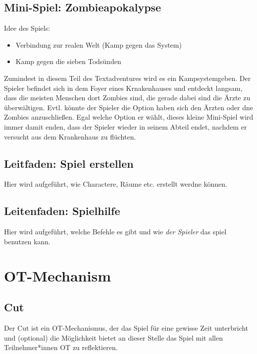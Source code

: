 \documentclass[a4paper, 12pt]{scrartcl}
\begin{document}
    \subsection{Mini-Spiel: Zombieapokalypse} \label{zombieapokalypse}
    Idee des Spiels:
    \begin{itemize}
    \item Verbindung zur realen Welt (Kamp gegen das System)
    \item Kamp gegen die sieben Todsünden
    \end{itemize}
    Zumindest in diesem Teil des Textadventures wird es ein Kampsystemgeben. 
    Der Spieler befindet sich in dem Foyer eines Krnakenhauses und entdeckt langsam, dass die meisten Menschen dort Zombies sind, die gerade dabei sind die Ärzte zu überwältigen. 
    Evtl. könnte der Spieler die Option haben sich den Ärzten oder dne Zombies anzuschließen.
    Egal welche Option er wählt, dieses kleine Mini-Spiel wird immer damit enden, dass der Spieler wieder in seinem Abteil endet, nachdem er versucht aus dem Krankenhaus zu flüchten.
    
    \subsection{Leitfaden: Spiel erstellen}
    Hier wird aufgeführt, wie Charactere, Räume etc. erstellt werdne können.
    
    \subsection{Leitenfaden: Spielhilfe}
    Hier wird aufgeführt, welche Befehle es gibt und wie \textit{der Spieler} das spiel benutzen kann.
    

    \section{OT-Mechanism}
    \subsection{Cut} \label{cut}
    Der Cut ist ein OT-Mechanismus, der das Spiel für eine gewisse Zeit unterbricht und (optional) die Möglichkeit bietet an dieser Stelle das Spiel mit allen Teilnehmer*innen OT zu reflektieren. 
\end{document}
